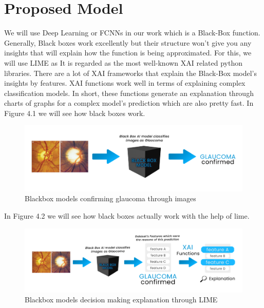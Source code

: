 \section{Proposed Model} 
We will use Deep Learning or FCNNs in our work which is a Black-Box function. Generally, Black boxes work excellently but their structure won’t give you any insights that will explain how the function is being approximated. For this, we will use LIME as It is regarded as the most well-known XAI related python libraries. There are a lot of XAI frameworks that explain the Black-Box model’s insights by features. XAI functions work well in terms of explaining complex classification models. In short, these functions generate an explanation through charts of graphs for a complex model’s prediction which are also pretty fast. In Figure 4.1 we will see how black boxes work.

\vspace{5mm}
\begin{figure}[htbp]
\centering
\includegraphics[scale=0.70]{images/fig-1.png}
\caption{Blackbox models confirming glaucoma through images}
\label{fig:x Blackbox models confirming glaucoma through images}
\end{figure}

\vspace{5mm}
In Figure 4.2 we will see how black boxes actually work with the help of lime.

\vspace{5mm}
\begin{figure}[htbp]
\centering
\includegraphics[scale=0.70]{images/fig-2.png}
\caption{Blackbox models decision making explanation through LIME}
\label{fig:x Blackbox models decision making explanation through LIME}
\end{figure}

